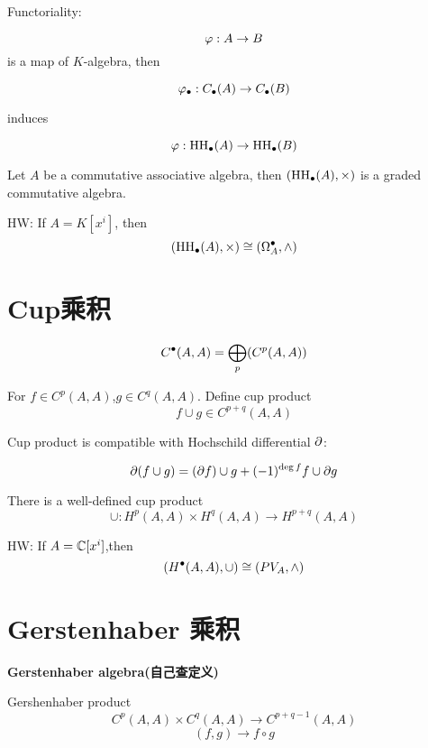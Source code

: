 
Functoriality:

$$\varphi:A\to B$$
is a map of $K$-algebra, then

$$\varphi_{\bullet}:C_{\bullet}(A)\to C_{\bullet}(B)$$

induces

$$\varphi:\operatorname{HH}_{\bullet}(A)\to \operatorname{HH}_{\bullet}(B)$$

\begin{cor}
Let $A$ be a commutative associative algebra, then
$(\operatorname{HH}_{\bullet}(A),\times)$ is a graded commutative algebra.
\end{cor}

HW: If $A=K[x^i]$, then
$$(\operatorname{HH}_{\bullet}(A),\times)\cong(\Omega_A^{\bullet},\wedge)$$

\section{Cup乘积}

$$C^{\bullet}(A,A)=\bigoplus_p(C^p(A,A))$$


\begin{definition}
For $f\in C^p(A,A)$,$g\in C^q(A,A)$. Define cup product
$$f\cup g\in C^{p+q}(A,A)$$
\end{definition}

\begin{prop}
Cup product is compatible with Hochschild differential $\partial$:

$$\partial(f\cup g)=(\partial f)\cup g+(-1)^{\deg f}f\cup\partial g$$
\end{prop}


\begin{cor}
There is a well-defined cup product
$$\cup: H^p(A,A)\times H^{q}(A,A)\to H^{p+q}(A,A)$$
\end{cor}

HW: If $A=\mathbb{C}[x^i]$,then
$$(H^{\bullet}(A,A),\cup)\cong (PV_A,\wedge)$$

\section{Gerstenhaber 乘积}
\textbf{Gerstenhaber algebra(自己查定义)}

\begin{definition}Gershenhaber product
$$C^{p}(A,A)\times C^q(A,A)\to C^{p+q-1}(A,A)$$
$$(f,g)\to f\circ g$$

\end{definition}


